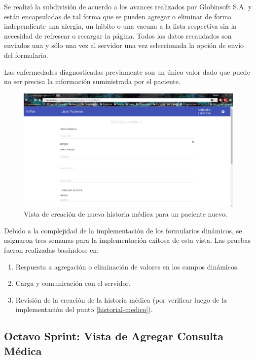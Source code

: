     Se realizó la subdivisión de acuerdo a los avances realizados por Globinsoft S.A. y están encapsuladas de tal forma que se pueden agregar o eliminar de forma independiente una alergia, un hábito o una vacuna a la lista respectiva sin la necesidad de refrescar o recargar la página. Todos los datos recaudados son enviados una y sólo una vez al servidor una vez seleccionada la opción de envío del formulario.
    
    Las enfermedades diagnosticadas previamente son un único valor dado que puede no ser precisa la información suministrada por el paciente.
    
    \begin{figure}[htbp!]
        \begin{center}
            \includegraphics[width=.9\textwidth]{figures/p10}
        \end{center}
        \caption{Vista de creación de nueva historia médica para un paciente nuevo.}
        \label{creación}
    \end{figure}
    
    Debido a la complejidad de la implementación de los formularios dinámicos, se asignaron tres semanas para la implementación exitosa de esta vista. Las pruebas fueron realizadas basándose en:
    
    \begin{enumerate}
        \item Respuesta a agregación o eliminación de valores en los campos dinámicos.
        \item Carga y comunicación con el servidor.
        \item Revisión de la creación de la historia médica (por verificar luego de la implementación del punto \ref{historial-medico}).
    \end{enumerate}

    \subsection{Octavo Sprint: Vista de Agregar Consulta Médica}
    \label{crear-consulta}
    
